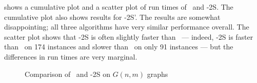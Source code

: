  shows a cumulative plot and a scatter plot of run times of \McSplit\ and \McSplit-2S.
The cumulative plot also shows results for \McSplit-2S'.  The results are somewhat disappointing; all three algorithms
have very similar performance overall.  The scatter plot shows that \McSplit-2S is often slightly faster than \McSplit\ --- indeed,
\McSplit-2S is faster than \McSplit\ on 174 instances and slower than \McSplit\ on only 91 instances --- but the differences
in run times are very marginal.

\begin{figure}[htb]
    \centering
    \caption{Comparison of \McSplit\ and \McSplit-2S on $G(n,m)$ graphs}
    \label{figure:mcsplit-vs-mcsplit2-gnm}
\end{figure}

